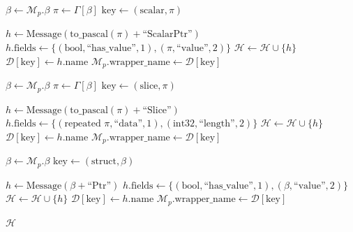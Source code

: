\begin{algorithm}[H]
\begin{algorithmic}[1]
            \STATE $\beta \leftarrow \mathcal{M}_p.\beta$ 
            \STATE $\pi \leftarrow \Gamma[\beta]$ 
            \STATE $\text{key} \leftarrow (\text{scalar}, \pi)$

                \STATE $h \leftarrow \text{Message}(\text{to\_pascal}(\pi) + \text{``ScalarPtr''})$
                \STATE $h.\text{fields} \leftarrow \{(\text{bool}, \text{``has\_value''}, 1), (\pi, \text{``value''}, 2)\}$
                \STATE $\mathcal{H} \leftarrow \mathcal{H} \cup \{h\}$
                \STATE $\mathcal{D}[\text{key}] \leftarrow h.\text{name}$
            \ENDIF
            \STATE $\mathcal{M}_p.\text{wrapper\_name} \leftarrow \mathcal{D}[\text{key}]$

            \STATE $\beta \leftarrow \mathcal{M}_p.\beta$
            \STATE $\pi \leftarrow \Gamma[\beta]$
            \STATE $\text{key} \leftarrow (\text{slice}, \pi)$

                \STATE $h \leftarrow \text{Message}(\text{to\_pascal}(\pi) + \text{``Slice''})$
                \STATE $h.\text{fields} \leftarrow \{(\text{repeated } \pi, \text{``data''}, 1), (\text{int32}, \text{``length''}, 2)\}$
                \STATE $\mathcal{H} \leftarrow \mathcal{H} \cup \{h\}$
                \STATE $\mathcal{D}[\text{key}] \leftarrow h.\text{name}$
            \ENDIF
            \STATE $\mathcal{M}_p.\text{wrapper\_name} \leftarrow \mathcal{D}[\text{key}]$

            \STATE $\beta \leftarrow \mathcal{M}_p.\beta$ 
            \STATE $\text{key} \leftarrow (\text{struct}, \beta)$

                \STATE $h \leftarrow \text{Message}(\beta + \text{``Ptr''})$
                \STATE $h.\text{fields} \leftarrow \{(\text{bool}, \text{``has\_value''}, 1), (\beta, \text{``value''}, 2)\}$
                \STATE $\mathcal{H} \leftarrow \mathcal{H} \cup \{h\}$
                \STATE $\mathcal{D}[\text{key}] \leftarrow h.\text{name}$
            \ENDIF
            \STATE $\mathcal{M}_p.\text{wrapper\_name} \leftarrow \mathcal{D}[\text{key}]$
        \ENDIF
    \ENDFOR

    \RETURN $\mathcal{H}$
\ENDPROCEDURE

\end{algorithmic}
\end{algorithm}

